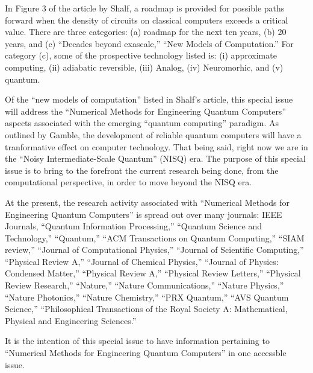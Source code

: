 \documentclass[]{article}
\begin{document}
In Figure 3 of the article by Shalf\cite{shalf2020future}, a roadmap is provided for possible paths forward when the density of circuits on classical computers exceeds a critical value.  There are three categories: (a) roadmap for the next ten years, (b) 20 years, and (c) ``Decades beyond exascale,'' ``New Models of Computation.'' For category (c), some of the prospective technology listed is:
(i) approximate computing, (ii) adiabatic reversible, (iii) Analog, (iv) Neuromorhic, and (v) quantum.

Of the ``new models of computation'' listed in 
Shalf's article\cite{shalf2020future}, this special issue will address
the ``Numerical Methods for Engineering Quantum Computers'' aspects associated with the
emerging ``quantum computing'' paradigm.  As outlined by
Gamble\cite{gamble2019quantum}, the development of reliable quantum
computers will have a tranformative effect on computer technology.  That being said, right now we are in the ``Noisy Intermediate-Scale Quantum''\cite{callison2022hybrid} (NISQ) era.  The purpose of this special issue is to bring to the forefront the current research being done, from the computational perspective, in order to move beyond the NISQ era.

\begin{comment}

Explains how the anticipated contribution of the special issue will advance understanding in this area;

\end{comment}

At the present, the research activity associated with ``Numerical Methods for Engineering Quantum Computers''
is spread out over many journals: IEEE Journals, 
``Quantum Information Processing,'' 
``Quantum Science and Technology,'' 
``Quantum,'' 
``ACM Transactions on Quantum Computing,''
``SIAM review,''
``Journal of Computational Physics,''
``Journal of Scientific Computing,''
``Physical Review A,'' 
``Journal of Chemical Physics,'' 
``Journal of Physics: Condensed Matter,''
``Physical Review A,''
``Physical Review Letters,''
``Physical Review Research,''
``Nature,''
``Nature Communications,''
``Nature Physics,''
``Nature Photonics,''
``Nature Chemistry,''
``PRX Quantum,''
``AVS Quantum Science,''
``Philosophical Transactions of the Royal Society A: Mathematical, Physical and Engineering Sciences.''

It is the intention of this special issue to have information pertaining
to ``Numerical Methods for Engineering Quantum Computers'' in one accessble issue.
\end{document}
